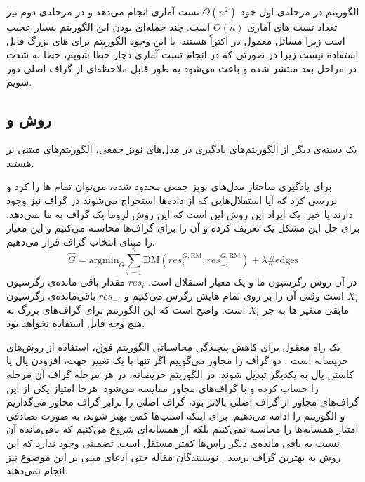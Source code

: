 \documentclass[a4paper,12pt]{article}
\def\hat{\widehat}
\begin{document}
الگوریتم 
در مرحله‌ی اول خود 
$O(n^2)$
تست آماری انجام می‌دهد و در مرحله‌ی دوم نیز تعداد تست های آماری
$O(n)$
است. چند جمله‌ای بودن این الگوریتم بسیار عجیب است زیرا مسائل معمول در 
اکثراً 
هستند. با این وجود الگوریتم 
برای  های بزرگ قابل استفاده نیست زیرا در صورتی که در انجام تست آماری دچار خطا شویم، خطا به شدت در مراحل بعد منتشر شده و باعث می‌شود به طور قابل ملاحظه‌ای از گراف اصلی دور شویم. 
\subsection{روش
	و 
}
یک دسته‌ی دیگر از الگوریتم‌های یادگیری در مدل‌های نویز جمعی، الگوریتم‌های مبتنی بر 
هستند. 

برای یادگیری ساختار مدل‌های نویز جمعی محدود شده، ‌می‌توان تمام
ها را 
کرد و بررسی کرد که آیا  استقلال‌هایی که از داده‌ها استخراج می‌شوند در گراف نیز وجود دارند  یا خیر. یک ایراد این روش  این است که این روش لزوما یک گراف
به ما نمی‌دهد. برای حل این مشکل یک 
تعریف کرده و آن را برای گراف‌ها محاسبه می‌کنیم و این معیار را مبنای انتخاب گراف قرار می‌دهیم.
$$\hat{G} = \mathrm{argmin}_G \sum_{i=1}^n \mathrm{DM}(res_i^{G, \mathrm{RM}}, res_{-i}^{G, \mathrm{RM}}) + \lambda \#\mathrm{edges}$$
در آن 
روش رگرسیون ما و 
یک معیار استقلال است.
$res_i$
مقدار باقی مانده‌ی رگرسیون $X_i$ است وقتی آن را بر روی تمام 
هایش رگرس می‌کنیم و 
$res_{-i}$
باقی‌مانده‌ی رگرسیون مابقی متغیر ها به جز $X_i$ است. واضح است که این الگوریتم برای گراف‌های بزرگ به هیچ وجه قابل استفاده نخواهد بود.

یک راه معقول برای کاهش پیچیدگی محاسباتی الگوریتم فوق، استفاده از روش‌های حریصانه است
\cite{continous}.
دو گراف را مجاور می‌گوییم اگر تنها با یک تغییر جهت، افزودن یال یا کاستن یال به یکدیگر تبدیل شوند. در الگوریتم حریصانه، در هر مرحله 
گراف آن مرحله را حساب کرده و با 
گراف‌های مجاور مقایسه‌ می‌شود. هرجا امتیاز یکی از این گراف‌های مجاور از گراف اصلی بالاتر بود، گراف اصلی را برابر گراف مجاور می‌گذاریم و الگوریتم را ادامه می‌دهیم. برای اینکه استپ‌ها کمی بهتر شوند، به صورت تصادفی امتیاز همسایه‌ها را محاسبه نمی‌کنیم بلکه از همسایه‌ای شروع می‌کنیم که باقی‌مانده آن نسبت به باقی ‌مانده‌ی دیگر راس‌ها کمتر مستقل است. تضمینی وجود ندارد که این روش به بهترین گراف برسد
\cite{continous}.
نویسندگان مقاله حتی ادعای مبنی بر این موضوع نیز انجام نمی‌دهند.
\end{document}
